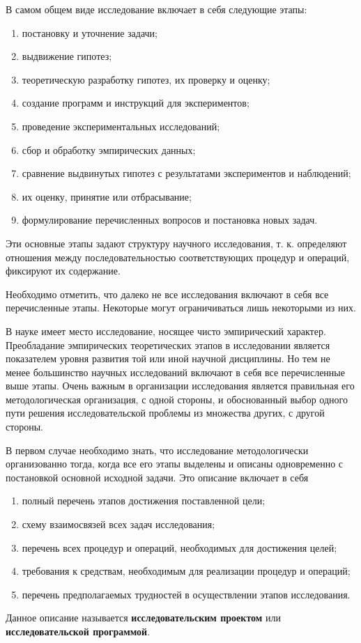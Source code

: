В самом общем виде исследование включает в себя следующие этапы:
\begin{enumerate}[label*=\arabic*)]
	\item  постановку и уточнение задачи;
	\item выдвижение гипотез;
	\item теоретическую разработку гипотез, их проверку и оценку;
	\item создание программ и инструкций для экспериментов; 
	\item проведение экспериментальных исследований;
	\item сбор и обработку эмпирических данных;
	\item сравнение выдвинутых гипотез с результатами экспериментов и
	наблюдений;
	\item их оценку, принятие или отбрасывание;
	\item формулирование перечисленных вопросов и постановка новых задач.
\end{enumerate}
Эти основные этапы задают структуру научного исследования, т. к.
определяют отношения между последовательностью соответствующих
процедур и операций, фиксируют их содержание. \cite{lit5}

Необходимо отметить, что далеко не все исследования включают в себя
все перечисленные этапы. Некоторые могут ограничиваться лишь некоторыми
из них. \cite{lit5}

В науке имеет место исследование, носящее чисто эмпирический характер.
Преобладание эмпирических теоретических этапов в исследовании является
показателем уровня развития той или иной научной дисциплины. Но тем не
менее большинство научных исследований включают в себя все перечисленные
выше этапы. Очень важным в организации исследования является правильная 
его методологическая организация, с одной стороны, и обоснованный выбор
одного пути решения исследовательской проблемы из множества других, с
другой стороны. \cite{lit5}

В первом случае необходимо знать, что исследование методологически
организованно тогда, когда все его этапы выделены и описаны одновременно с
постановкой основной исходной задачи. Это описание включает в себя
\begin{enumerate}[label*=\arabic*)]
	\item полный перечень этапов достижения поставленной цели;
	\item схему взаимосвязей всех задач исследования;
	\item перечень всех процедур и операций, необходимых для достижения
	целей;
	\item требования к средствам, необходимым для реализации процедур и
	операций;
	\item перечень предполагаемых трудностей в осуществлении
	этапов исследования.
\end{enumerate}
Данное описание называется \textbf{исследовательским проектом} или
\textbf{исследовательской программой}.

